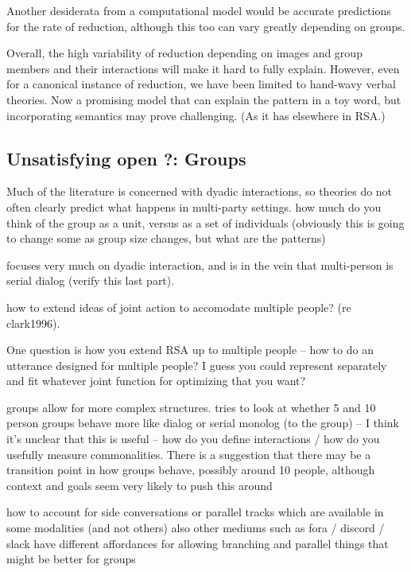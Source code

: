 \documentclass[]{article}
\begin{document}
Another desiderata from a computational model would be accurate predictions for the rate of reduction, although this too can vary greatly depending on groups. 

Overall, the high variability of reduction depending on images and group members and their interactions will make it hard to fully explain. However, even for a canonical instance of reduction, we have been limited to hand-wavy verbal theories. Now a promising model that can explain the pattern in a toy word, but incorporating semantics may prove challenging. (As it has elsewhere in RSA.) 



\subsection{Unsatisfying open ?: Groups}

Much of the literature is concerned with dyadic interactions, so theories do not often clearly predict what happens in multi-party settings. 
\cite{yoon2019} how much do you think of the group as a unit, versus as a set of individuals (obviously this is going to change some as group size changes, but what are the patterns) 

\cite{clark1996} focuses very much on dyadic interaction, and is in the vein that multi-person is serial dialog (verify this last part). 

how to extend ideas of joint action to accomodate multiple people? (re clark1996). 

One question is how you extend RSA up to multiple people -- how to do an utterance designed for multiple people? I guess you could represent separately and fit whatever joint function for optimizing that you want? 

groups allow for more complex structures. \cite{fay2000} tries to look at whether 5 and 10 person groups behave more like dialog or serial monolog (to the group) -- I think it's unclear that this is useful -- how do you define interactions / how do you usefully measure commonalities. There is a suggestion that there may be a transition point in how groups behave, possibly around 10 people, although context and goals seem very likely to push this around 

how to account for side conversations or parallel tracks which are available in some modalities (and not others) also other mediums such as fora / discord / slack have different affordances for allowing branching and parallel things that might be better for groups 
\end{document}
